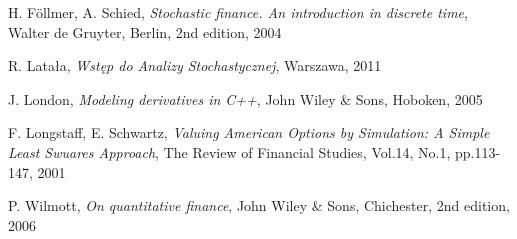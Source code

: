\documentclass[a4paper,12pt, twoside]{book}
\theoremstyle{definition}
\theoremstyle{remark}
\begin{document}
\begin{thebibliography}{99}

H. F\"{o}llmer, A. Schied, \emph{Stochastic finance. An introduction in discrete time}, Walter de Gruyter, Berlin, 2nd edition, 2004

R. Latała, \emph{Wstęp do Analizy Stochastycznej}, Warszawa, 2011

J. London, \emph{Modeling derivatives in C++}, John Wiley \& Sons, Hoboken, 2005

F. Longstaff, E. Schwartz, \emph{Valuing American Options by Simulation: A Simple Least Swuares Approach}, The Review of Financial Studies, Vol.14, No.1, pp.113-147, 2001

P. Wilmott, \emph{On quantitative finance}, John Wiley \& Sons, Chichester, 2nd edition, 2006

\end{thebibliography}
\end{document}
